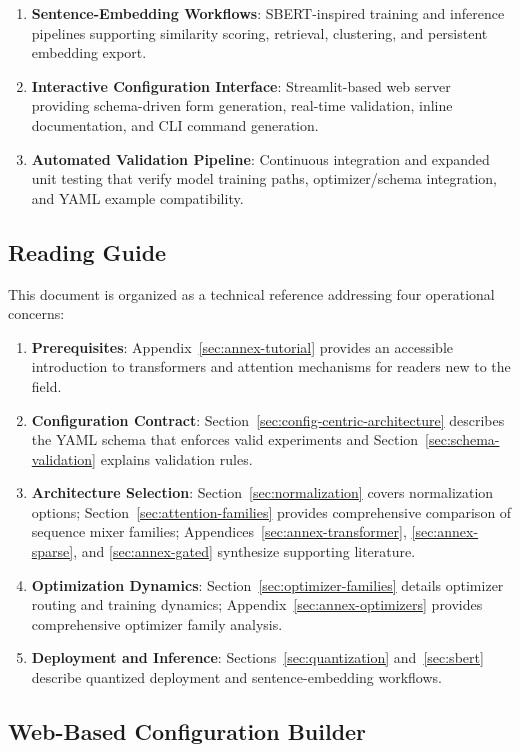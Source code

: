 \documentclass[11pt,a4paper]{article}
\begin{document}
\begin{enumerate}[leftmargin=*]
    \item \textbf{Sentence-Embedding Workflows}: SBERT-inspired training and inference pipelines supporting similarity scoring, retrieval, clustering, and persistent embedding export.
    \item \textbf{Interactive Configuration Interface}: Streamlit-based web server providing schema-driven form generation, real-time validation, inline documentation, and CLI command generation.
    \item \textbf{Automated Validation Pipeline}: Continuous integration and expanded unit testing that verify model training paths, optimizer/schema integration, and YAML example compatibility.
\end{enumerate}

\subsection{Reading Guide}

This document is organized as a technical reference addressing four operational concerns:
\begin{enumerate}[leftmargin=*]
    \item \textbf{Prerequisites}: Appendix~\ref{sec:annex-tutorial} provides an accessible introduction to transformers and attention mechanisms for readers new to the field.
    \item \textbf{Configuration Contract}: Section~\ref{sec:config-centric-architecture} describes the YAML schema that enforces valid experiments and Section~\ref{sec:schema-validation} explains validation rules.
    \item \textbf{Architecture Selection}: Section~\ref{sec:normalization} covers normalization options; Section~\ref{sec:attention-families} provides comprehensive comparison of sequence mixer families; Appendices~\ref{sec:annex-transformer}, \ref{sec:annex-sparse}, and \ref{sec:annex-gated} synthesize supporting literature.
    \item \textbf{Optimization Dynamics}: Section~\ref{sec:optimizer-families} details optimizer routing and training dynamics; Appendix~\ref{sec:annex-optimizers} provides comprehensive optimizer family analysis.
    \item \textbf{Deployment and Inference}: Sections~\ref{sec:quantization} and~\ref{sec:sbert} describe quantized deployment and sentence-embedding workflows.
\end{enumerate}

\subsection{Web-Based Configuration Builder}
\end{document}
